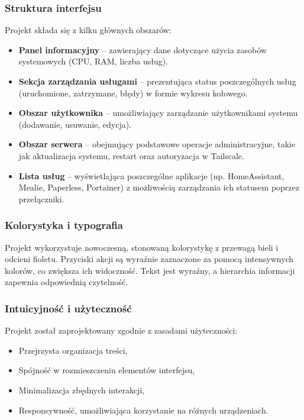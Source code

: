 \subsubsection{Struktura interfejsu}
Projekt składa się z kilku głównych obszarów:
\begin{itemize}
    \item \textbf{Panel informacyjny} – zawierający dane dotyczące użycia zasobów systemowych (CPU, RAM, liczba usług).
    \item \textbf{Sekcja zarządzania usługami} – prezentująca status poszczególnych usług (uruchomione, zatrzymane, błędy) w formie wykresu kołowego.
    \item \textbf{Obszar użytkownika} – umożliwiający zarządzanie użytkownikami systemu (dodawanie, usuwanie, edycja).
    \item \textbf{Obszar serwera} – obejmujący podstawowe operacje administracyjne, takie jak aktualizacja systemu, restart oraz autoryzacja w Tailscale.
    \item \textbf{Lista usług} – wyświetlająca poszczególne aplikacje (np. HomeAssistant, Mealie, Paperless, Portainer) z możliwością zarządzania ich statusem poprzez przełączniki.
\end{itemize}

\subsubsection{Kolorystyka i typografia}
Projekt wykorzystuje nowoczesną, stonowaną kolorystykę z przewagą bieli i odcieni fioletu. Przyciski akcji są wyraźnie zaznaczone za pomocą intensywnych kolorów, co zwiększa ich widoczność. Tekst jest wyraźny, a hierarchia informacji zapewnia odpowiednią czytelność.

\subsubsection{Intuicyjność i użyteczność}
Projekt został zaprojektowany zgodnie z zasadami użyteczności:
\begin{itemize}
    \item Przejrzysta organizacja treści,
    \item Spójność w rozmieszczeniu elementów interfejsu,
    \item Minimalizacja zbędnych interakcji,
    \item Responsywność, umożliwiająca korzystanie na różnych urządzeniach.
\end{itemize}

